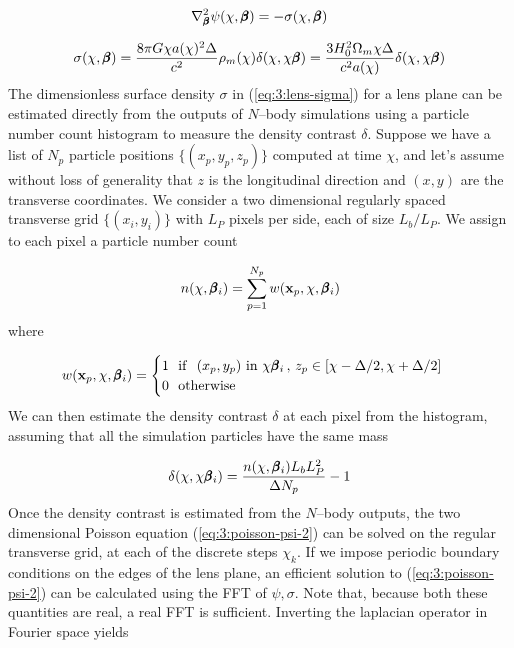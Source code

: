 \begin{equation}
\label{eq:3:poisson-psi-2}
\nabla^2_{\pmb{\beta}}\psi(\chi,\pmb{\beta}) = -\sigma(\chi,\pmb{\beta})  
\end{equation} 

\begin{equation}
\label{eq:3:lens-sigma}
\sigma(\chi,\pmb{\beta}) = \frac{8\pi G \chi a(\chi)^2\Delta}{c^2}\rho_m(\chi)\delta(\chi,\chi\pmb{\beta}) = \frac{3H_0^2\Omega_m\chi\Delta}{c^2 a(\chi)}\delta(\chi,\chi\pmb{\beta})
\end{equation}
%
The dimensionless surface density $\sigma$ in (\ref{eq:3:lens-sigma}) for a lens plane can be estimated directly from the outputs of $N$--body simulations using a particle number count histogram to measure the density contrast $\delta$. Suppose we have a list of $N_p$ particle positions $\{(x_p,y_p,z_p)\}$ computed at time $\chi$, and let's assume without loss of generality that $z$ is the longitudinal direction and $(x,y)$ are the transverse coordinates. We consider a two dimensional regularly spaced transverse grid $\{(x_i,y_i)\}$ with $L_P$ pixels per side, each of size $L_b/L_P$. We assign to each pixel a particle number count

\begin{equation}
\label{eq:3:number-hist}
n(\chi, \pmb{\beta}_i) = \sum_{p=1}^{N_p}w(\mathbf{x}_p,\chi,\pmb{\beta}_i)
\end{equation}  
%
where 

\begin{equation}
\label{eq:3:number-kernel}
w(\mathbf{x}_p,\chi,\pmb{\beta}_i) = 
\begin{cases}
1 \,\,\,\, {\rm if} \,\,\,\, (x_p,y_p) \,\, {\rm in} \,\, \chi\pmb{\beta}_i \, , \, z_p\in [\chi-\Delta/2,\chi+\Delta/2] \\
0 \,\,\,\, {\rm otherwise}
\end{cases}
\end{equation}
%
We can then estimate the density contrast $\delta$ at each pixel from the histogram, assuming that all the simulation particles have the same mass

\begin{equation}
\label{eq:3:delta-hist}
\delta(\chi,\chi\pmb{\beta}_i) = \frac{n(\chi,\pmb{\beta}_i)L_bL_P^2 }{\Delta N_p} - 1
\end{equation}
%
Once the density contrast is estimated from the $N$--body outputs, the two dimensional Poisson equation (\ref{eq:3:poisson-psi-2}) can be solved on the regular transverse grid, at each of the discrete steps $\chi_k$. If we impose periodic boundary conditions on the edges of the lens plane, an efficient solution to (\ref{eq:3:poisson-psi-2}) can be calculated using the FFT of $\psi,\sigma$. Note that, because both these quantities are real, a real FFT is sufficient. Inverting the laplacian operator in Fourier space yields

